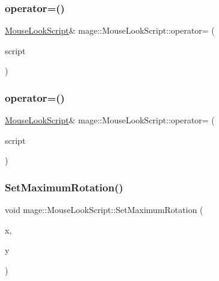 \subsubsection{\texorpdfstring{operator=()}{operator=()}\hspace{0.1cm}{\footnotesize\ttfamily [1/2]}}
{\footnotesize\ttfamily \hyperlink{classmage_1_1_mouse_look_script}{Mouse\+Look\+Script}\& mage\+::\+Mouse\+Look\+Script\+::operator= (\begin{DoxyParamCaption}\item[{const \hyperlink{classmage_1_1_mouse_look_script}{Mouse\+Look\+Script} \&}]{script }\end{DoxyParamCaption})\hspace{0.3cm}{\ttfamily [delete]}}

\hypertarget{classmage_1_1_mouse_look_script_a2754174f5595fa424471c631818dc2b6}{}\label{classmage_1_1_mouse_look_script_a2754174f5595fa424471c631818dc2b6} 
\subsubsection{\texorpdfstring{operator=()}{operator=()}\hspace{0.1cm}{\footnotesize\ttfamily [2/2]}}
{\footnotesize\ttfamily \hyperlink{classmage_1_1_mouse_look_script}{Mouse\+Look\+Script}\& mage\+::\+Mouse\+Look\+Script\+::operator= (\begin{DoxyParamCaption}\item[{\hyperlink{classmage_1_1_mouse_look_script}{Mouse\+Look\+Script} \&\&}]{script }\end{DoxyParamCaption})\hspace{0.3cm}{\ttfamily [delete]}}

\hypertarget{classmage_1_1_mouse_look_script_aeffd8aa88e7ae4741f1610a28d0243c4}{}\label{classmage_1_1_mouse_look_script_aeffd8aa88e7ae4741f1610a28d0243c4} 
\subsubsection{\texorpdfstring{Set\+Maximum\+Rotation()}{SetMaximumRotation()}\hspace{0.1cm}{\footnotesize\ttfamily [1/4]}}
{\footnotesize\ttfamily void mage\+::\+Mouse\+Look\+Script\+::\+Set\+Maximum\+Rotation (\begin{DoxyParamCaption}\item[{float}]{x,  }\item[{float}]{y }\end{DoxyParamCaption})\hspace{0.3cm}{\ttfamily [noexcept]}}

